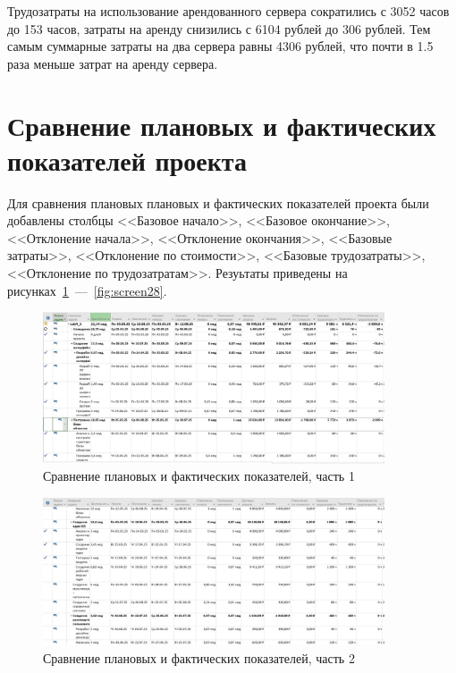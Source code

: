 Трудозатраты на использование арендованного сервера сократились с 3052 часов до 153 часов, затраты на аренду снизились с 6104 рублей до 306 рублей. 
Тем самым суммарные затраты на два сервера равны 4306 рублей, что почти в 1.5 раза меньше затрат на аренду сервера.

\section{Сравнение плановых и фактических показателей проекта}

Для сравнения плановых плановых и фактических показателей проекта были добавлены столбцы <<Базовое начало>>, <<Базовое окончание>>, <<Отклонение начала>>, <<Отклонение окончания>>, <<Базовые затраты>>, <<Отклонение по стоимости>>, <<Базовые трудозатраты>>, <<Отклонение по трудозатратам>>.
Резуьтаты приведены на рисунках~\ref{fig:screen26}~---~\ref{fig:screen28}.

\begin{figure}[H]
	\centering
	\includegraphics[width=0.9\textwidth]{img/screen26.jpg}
	\caption{Сравнение плановых и фактических показателей, часть 1}
	\label{fig:screen26}
\end{figure}

\begin{figure}[H]
	\centering
	\includegraphics[width=0.9\textwidth]{img/screen27.jpg}
	\caption{Сравнение плановых и фактических показателей, часть 2}
	\label{fig:screen27}
\end{figure}

